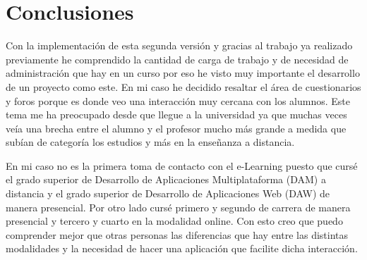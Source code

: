 \section{Conclusiones}
Con la implementación de esta segunda versión y gracias al trabajo ya realizado previamente he comprendido la cantidad de carga de trabajo y de necesidad de administración que hay en un curso por eso he visto muy importante el desarrollo de un proyecto como este. En mi caso he decidido resaltar el área de cuestionarios y foros porque es donde veo una interacción muy cercana con los alumnos. Este tema me ha preocupado desde que llegue a la universidad ya que muchas veces veía una brecha entre el alumno y el profesor mucho más grande a medida que subían de categoría los estudios y más en la enseñanza a distancia.

En mi caso no es la primera toma de contacto con el e-Learning puesto que cursé el grado superior de Desarrollo de Aplicaciones Multiplataforma (DAM) a distancia y el grado superior de Desarrollo de Aplicaciones Web (DAW) de manera presencial. Por otro lado cursé primero y segundo de carrera de manera presencial y tercero y cuarto en la modalidad online. Con esto creo que puedo comprender mejor que otras personas las diferencias que hay entre las distintas modalidades y la necesidad de hacer una aplicación que facilite dicha interacción.

